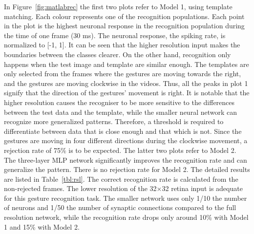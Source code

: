 \documentclass[journal]{journal}
\begin{document}
In Figure~\ref{fig:matlabrec} the first two plots refer to Model 1, using template matching. Each colour represents one of the recognition populations. 
Each point in the plot is the highest neuronal response in the recognition population during the time of one frame (30 ms). 
The neuronal response, the spiking rate, is normalized to [-1, 1]. 
It can be seen that the higher resolution input makes the boundaries between the classes clearer. 
On the other hand, recognition only happens when the test image and template are similar enough. 
The templates are only selected from the frames where the gestures are moving towards the right, and the gestures are moving clockwise in the videos. 
Thus, all the peaks in plot 1 signify that the direction of the gestures’ movement is right.  
It is notable that the higher resolution causes the recogniser to be more sensitive to the differences between the test data and the template, while the smaller neural network can recognize more generalized patterns. 
Therefore, a threshold is required to differentiate between data that is close enough and that which is not. 
Since the gestures are moving in four different directions during the clockwise movement, a rejection rate of 75\% is to be expected. 
The latter two plots refer to Model 2. 
The three-layer MLP network significantly improves the recognition rate and can generalize the pattern. 
There is no rejection rate for Model 2. 
The detailed results are listed in  Table~\ref{tbl:rsl}. 
The correct recognition rate is calculated from the non-rejected frames.
The lower resolution of the 32$\times$32 retina input is adequate for this gesture recognition task. 
The smaller network uses only 1/10 the number of neurons and 1/50 the number of synaptic connections compared to the full resolution network, while the recognition rate drops only around 10\% with Model 1 and 15\% with Model 2.
\end{document}

